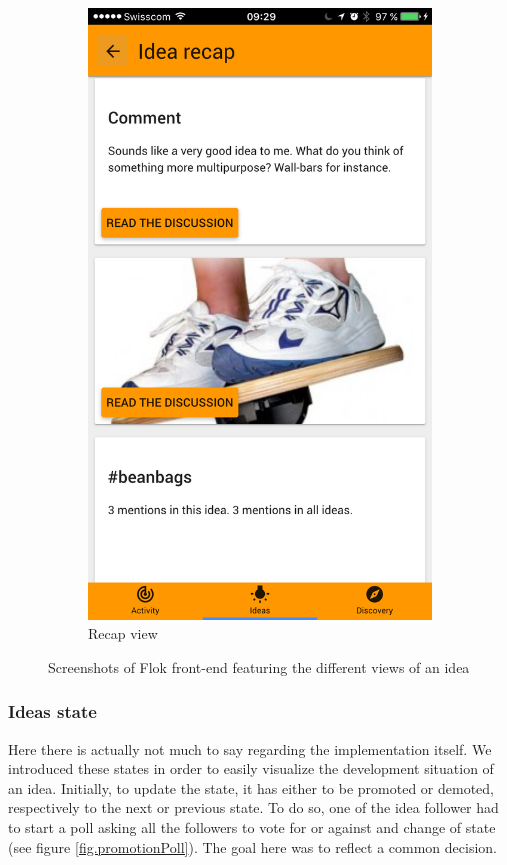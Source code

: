 \documentclass[a4paper,12pt,twoside]{article}
\begin{document}
\begin{figure}[!htb]
\begin{subfigure}[t]{.32\textwidth}
        \includegraphics[width=\textwidth]{images/ideaRecap.png}
        \caption{Recap view}
        \label{fig.idea.recap}
    \end{subfigure}
    \caption{Screenshots of Flok front-end featuring the different views of an idea}
    \label{fig.idea}
\end{figure}

\FloatBarrier
\subsubsection{Ideas state}
\label{sec.ideasState}
Here there is actually not much to say regarding the implementation itself.
We introduced these states in order to easily visualize the development situation of an idea.
Initially, to update the state, it has either to be promoted or demoted, respectively to the next or previous state.
To do so, one of the idea follower had to start a poll asking all the followers to vote for or against and change of state (see figure \ref{fig.promotionPoll}).
The goal here was to reflect a common decision.
\end{document}

